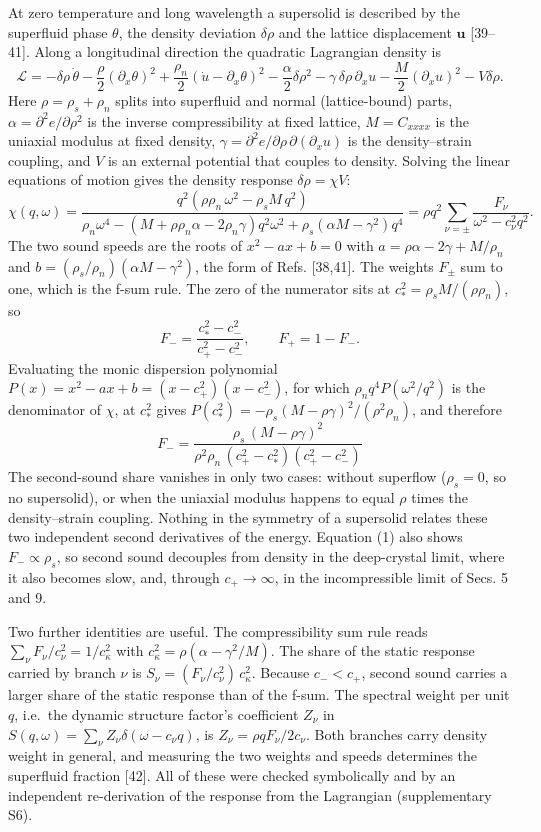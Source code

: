 \documentclass[
  11pt,
]{article}
\begin{document}
At zero temperature and long wavelength a supersolid is described by the
superfluid phase \(\theta\), the density deviation \(\delta\rho\) and
the lattice displacement \(\mathbf u\) {[}39--41{]}. Along a
longitudinal direction the quadratic Lagrangian density is
\[\mathcal L=-\delta\rho\,\dot\theta-\frac{\rho}{2}(\partial_x\theta)^2+\frac{\rho_n}{2}(\dot u-\partial_x\theta)^2-\frac{\alpha}{2}\delta\rho^2-\gamma\,\delta\rho\,\partial_xu-\frac{M}{2}(\partial_xu)^2-V\delta\rho .\]
Here \(\rho=\rho_s+\rho_n\) splits into superfluid and normal
(lattice-bound) parts, \(\alpha=\partial^2e/\partial\rho^2\) is the
inverse compressibility at fixed lattice, \(M=C_{xxxx}\) is the uniaxial
modulus at fixed density,
\(\gamma=\partial^2e/\partial\rho\,\partial(\partial_xu)\) is the
density--strain coupling, and \(V\) is an external potential that
couples to density. Solving the linear equations of motion gives the
density response \(\delta\rho=\chi V\):
\[\chi(q,\omega)=\frac{q^2\left(\rho\rho_n\,\omega^2-\rho_sM\,q^2\right)}{\rho_n\omega^4-\left(M+\rho\rho_n\alpha-2\rho_n\gamma\right)q^2\omega^2+\rho_s\left(\alpha M-\gamma^2\right)q^4}
=\rho q^2\sum_{\nu=\pm}\frac{F_\nu}{\omega^2-c_\nu^2q^2}.\] The two
sound speeds are the roots of \(x^2-ax+b=0\) with
\(a=\rho\alpha-2\gamma+M/\rho_n\) and
\(b=(\rho_s/\rho_n)(\alpha M-\gamma^2)\), the form of Refs. {[}38,41{]}.
The weights \(F_\pm\) sum to one, which is the f-sum rule. The zero of
the numerator sits at \(c_*^2=\rho_sM/(\rho\rho_n)\), so
\[F_-=\frac{c_*^2-c_-^2}{c_+^2-c_-^2},\qquad F_+=1-F_-.\] Evaluating the
monic dispersion polynomial \(P(x)=x^2-ax+b=(x-c_+^2)(x-c_-^2)\), for
which \(\rho_nq^4P(\omega^2/q^2)\) is the denominator of \(\chi\), at
\(c_*^2\) gives \(P(c_*^2)=-\rho_s(M-\rho\gamma)^2/(\rho^2\rho_n)\), and
therefore
\[\boxed{F_-=\frac{\rho_s\,(M-\rho\gamma)^2}{\rho^2\rho_n\,(c_+^2-c_*^2)(c_+^2-c_-^2)}}\tag{1}\]
The second-sound share vanishes in only two cases: without superflow
(\(\rho_s=0\), so no supersolid), or when the uniaxial modulus happens
to equal \(\rho\) times the density--strain coupling. Nothing in the
symmetry of a supersolid relates these two independent second
derivatives of the energy. Equation (1) also shows \(F_-\propto\rho_s\),
so second sound decouples from density in the deep-crystal limit, where
it also becomes slow, and, through \(c_+\to\infty\), in the
incompressible limit of Secs. 5 and 9.

Two further identities are useful. The compressibility sum rule reads
\(\sum_\nu F_\nu/c_\nu^2=1/c_\kappa^2\) with
\(c_\kappa^2=\rho(\alpha-\gamma^2/M)\). The share of the static response
carried by branch \(\nu\) is \(S_\nu=(F_\nu/c_\nu^2)\,c_\kappa^2\).
Because \(c_-<c_+\), second sound carries a larger share of the static
response than of the f-sum. The spectral weight per unit \(q\), i.e.~the
dynamic structure factor's coefficient \(Z_\nu\) in
\(S(q,\omega)=\sum_\nu Z_\nu\delta(\omega-c_\nu q)\), is
\(Z_\nu=\rho qF_\nu/2c_\nu\). Both branches carry density weight in
general, and measuring the two weights and speeds determines the
superfluid fraction {[}42{]}. All of these were checked symbolically and
by an independent re-derivation of the response from the Lagrangian
(supplementary S6).
\end{document}

